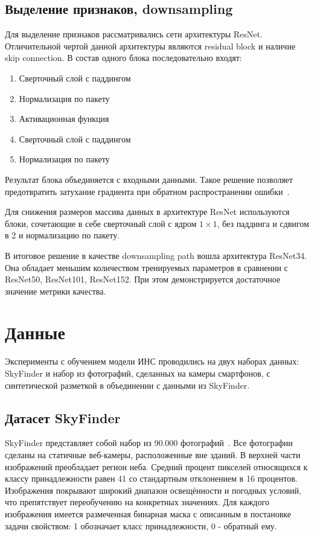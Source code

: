 \subsection{Выделение признаков, downsampling}

Для выделение признаков рассматривались сети архитектуры ResNet.
Отличительной чертой данной архитектуры являются residual block и наличие skip connection.
В состав одного блока последовательно входят:

\begin{enumerate}
    \item Сверточный слой с паддингом
    \item Нормализация по пакету
    \item Активационная функция
    \item Сверточный слой с паддингом
    \item Нормализация по пакету
\end{enumerate}

Результат блока объединяется с входными данными.
Такое решение позволяет предотвратить затухание градиента при обратном распространении ошибки~\autocite{he2015deep}.

Для снижения размеров массива данных в архитектуре ResNet используются блоки, сочетающие в себе сверточный слой
с ядром $1 \times 1$, без паддинга и сдвигом в 2 и нормализацию по пакету.

В итоговое решение в качестве downsampling path вошла архитектура ResNet34.
Она обладает меньшим количеством тренируемых параметров в сравнении с ResNet50, ResNet101, ResNet152.
При этом демонстрируется достаточное значение метрики качества.

\section{Данные}

Эксперименты с обучением модели ИНС проводились на двух наборах данных: SkyFinder и набор из фотографий, сделанных на камеры смартфонов,
с синтетической разметкой в объединении с данными из SkyFinder.

\subsection{Датасет SkyFinder}

SkyFinder представляет собой набор из 90.000 фотографий~\autocite{mihail2016sky}.
Все фотографии сделаны на статичные веб-камеры, расположенные вне зданий.
В верхней части изображений преобладает регион неба.
Средний процент пикселей относящихся к классу принадлежности равен 41 со стандартным отклонением в 16 процентов.
Изображения покрывают широкий диапазон освещённости и погодных условий, что препятствует переобучению на конкретных значениях.
Для каждого изображения имеется размеченная бинарная маска с описанным в постановке задачи свойством: 1 обозначает класс принадлежности, 0 - обратный ему.

